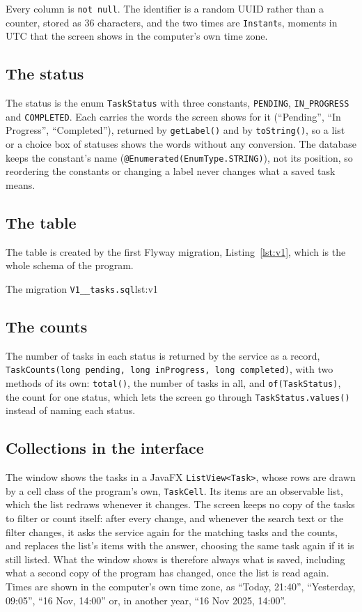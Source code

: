 Every column is \texttt{not null}. The identifier is a random UUID rather than a counter, stored as 36 characters,
and the two times are \texttt{Instant}s, moments in UTC that the screen shows in the computer's own time zone.

\subsection{The status}

The status is the enum \texttt{TaskStatus} with three constants, \texttt{PENDING}, \texttt{IN\_PROGRESS} and
\texttt{COMPLETED}. Each carries the words the screen shows for it (``Pending'', ``In Progress'', ``Completed''),
returned by \texttt{getLabel()} and by \texttt{toString()}, so a list or a choice box of statuses shows the words
without any conversion. The database keeps the constant's name (\texttt{@Enumerated(EnumType.STRING)}), not its
position, so reordering the constants or changing a label never changes what a saved task means.

\subsection{The table}

The table is created by the first Flyway migration, Listing~\ref{lst:v1}, which is the whole schema of the program.

  {The migration \texttt{V1\_\_tasks.sql}}{lst:v1}

\subsection{The counts}

The number of tasks in each status is returned by the service as a record,
\texttt{TaskCounts(long pending, long inProgress, long completed)}, with two methods of its own: \texttt{total()}, the
number of tasks in all, and \texttt{of(TaskStatus)}, the count for one status, which lets the screen go through
\texttt{TaskStatus.values()} instead of naming each status.

\subsection{Collections in the interface}

The window shows the tasks in a JavaFX \texttt{ListView<Task>}, whose rows are drawn by a cell class of the
program's own, \texttt{TaskCell}. Its items are an observable list, which the list redraws whenever it changes. The
screen keeps no copy of the tasks to filter or count itself: after every change, and whenever the search text or the
filter changes, it asks the service again for the matching tasks and the counts, and replaces the list's items with
the answer, choosing the same task again if it is still listed. What the window shows is therefore always what is
saved, including what a second copy of the program has changed, once the list is read again. Times are shown in the
computer's own time zone, as ``Today, 21:40'', ``Yesterday, 09:05'', ``16 Nov, 14:00'' or, in another year,
``16 Nov 2025, 14:00''.

